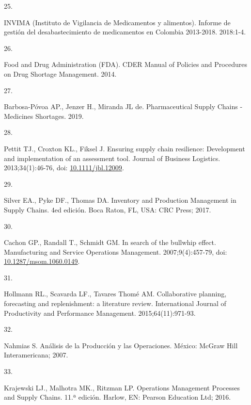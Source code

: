 \documentclass[
]{book}
\newlength{\cslhangindent}
\newlength{\csllabelwidth}
\newlength{\cslentryspacingunit} %
\newenvironment{CSLReferences}[2] %
 {%
  \setlength{\parindent}{0pt}
  \ifodd #1
  \let\oldpar\par
  \def\par{\hangindent=\cslhangindent\oldpar}
  \fi
  \setlength{\parskip}{#2\cslentryspacingunit}
 }%
 {}
\newcommand{\CSLLeftMargin}[1]{\parbox[t]{\csllabelwidth}{#1}}
\newcommand{\CSLRightInline}[1]{\parbox[t]{\linewidth - \csllabelwidth}{#1}\break}
\begin{document}
\begin{CSLReferences}{0}{0}
\leavevmode{}%
\CSLLeftMargin{25. }
\CSLRightInline{INVIMA (Instituto de Vigilancia de Medicamentos y alimentos). {Informe de gesti{ó}n del desabastecimiento de medicamentos en Colombia 2013-2018}. 2018:1-4.}

\leavevmode{}%
\CSLLeftMargin{26. }
\CSLRightInline{Food and Drug Administration (FDA). {CDER Manual of Policies and Procedures on Drug Shortage Management}. 2014.}

\leavevmode{}%
\CSLLeftMargin{27. }
\CSLRightInline{Barbosa-Póvoa AP., Jenzer H., Miranda JL de. {Pharmaceutical Supply Chains - Medicines Shortages}. 2019.}

\leavevmode{}%
\CSLLeftMargin{28. }
\CSLRightInline{Pettit TJ., Croxton KL., Fiksel J. {Ensuring supply chain resilience: Development and implementation of an assessment tool}. Journal of Business Logistics. 2013;34(1):46-76, doi: \href{https://doi.org/10.1111/jbl.12009}{10.1111/jbl.12009}.}

\leavevmode{}%
\CSLLeftMargin{29. }
\CSLRightInline{Silver EA., Pyke DF., Thomas DA. {Inventory and Production Management in Supply Chains}. 4ed edición. Boca Raton, FL, USA: CRC Press; 2017.}

\leavevmode{}%
\CSLLeftMargin{30. }
\CSLRightInline{Cachon GP., Randall T., Schmidt GM. {In search of the bullwhip effect}. Manufacturing and Service Operations Management. 2007;9(4):457-79, doi: \href{https://doi.org/10.1287/msom.1060.0149}{10.1287/msom.1060.0149}.}

\leavevmode{}%
\CSLLeftMargin{31. }
\CSLRightInline{Hollmann RL., Scavarda LF., Tavares Thomé AM. {Collaborative planning, forecasting and replenishment: a literature review}. International Journal of Productivity and Performance Management. 2015;64(11):971-93.}

\leavevmode{}%
\CSLLeftMargin{32. }
\CSLRightInline{Nahmias S. {An{á}lisis de la Producci{ó}n y las Operaciones}. M{é}xico: McGraw Hill Interamericana; 2007.}

\leavevmode{}%
\CSLLeftMargin{33. }
\CSLRightInline{Krajewski LJ., Malhotra MK., Ritzman LP. {Operations Management Processes and Supply Chains}. 11.ª edición. Harlow, EN: Pearson Education Ltd; 2016.}


\end{CSLReferences}
\end{document}

